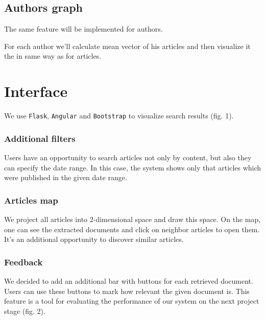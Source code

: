 \subsection{Authors graph}
The same feature will be implemented for authors. 

For each author we'll calculate mean vector of his articles and then visualize it the in same way as for articles.

\section{Interface}
We use \texttt{Flask}, \texttt{Angular} and \texttt{Bootstrap} to visualize search results (fig. 1).

\subsubsection{Additional filters}
Users have an opportunity to search articles not only by content, but also they can specify the date range. In this case, the system shows only that articles which were published in the given date range.

\subsubsection{Articles map}
We project all articles into 2-dimensional space and draw this space. On the map, one can see the extracted documents and click on neighbor articles to open them. It's an additional opportunity to discover similar articles.  

\subsubsection{Feedback}
We decided to add an additional bar with buttons for each retrieved document. Users can use these buttons to mark how relevant the given document is. This feature is a tool for evaluating the performance of our system on the next project stage (fig. 2).

